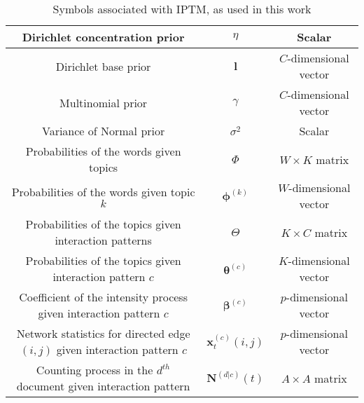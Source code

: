 \documentclass[a4paper]{article}
\begin{document}
\begin{table}[ht]
{\begin{tabular}{ |c|c|c|}
  								\hline				 	
  									Dirichlet concentration  prior&$\eta$ & Scalar \\
  									\hline		
  										Dirichlet base prior&$\boldsymbol{l}$ & $C$-dimensional vector  \\
  										\hline			
  				Multinomial prior&$\gamma$ & $C$-dimensional vector \\
  				\hline
  				Variance of Normal prior&$\sigma^2$ & Scalar \\
  				\hline		
  					Probabilities of the words given topics &$\Phi$ & $W \times K$ matrix \\
  					\hline		
  						Probabilities of the words given topic $k$ &$\boldsymbol{\phi}^{(k)}$ & $W$-dimensional vector\\
  						\hline
  							Probabilities of the topics given interaction patterns &$\Theta$ & $K \times C$ matrix \\
  							\hline		
  							Probabilities of the topics given interaction pattern $c$ &$\boldsymbol{\theta}^{(c)}$ & $K$-dimensional vector\\
  						\hline		
  						Coefficient of the intensity process given interaction pattern $c$ &$\boldsymbol{\beta}^{(c)}$ & $p$-dimensional vector\\
  							\hline		
  					Network statistics for directed edge $(i, j)$ given interaction pattern $c$ &$\boldsymbol{x}^{(c)}_t{(i,j)}$ & $p$-dimensional vector\\
  						\hline		
  				Counting process in the $d^{th}$ document given interaction pattern &	$\mathbf{N}^{(d|c)}(t)$ & $A\times A$ matrix\\
  						\hline
  						\hline
 	\end{tabular}}
 	\caption {Symbols associated with IPTM, as used in this work}
 	\label{table:SymbolsIPTM}
 \end{table}
\normalsize
\end{document}
